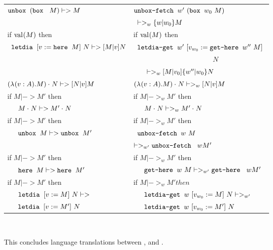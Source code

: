 \footnotesize
\begin{tabular}{@{} l l}

\langLF{}  &  \langHyb{} \\[0.1cm]
\hline

$\unbox (\bbox {} M) |-> M$  & 
$\unboxfetch {w'} (\bbox {w_0} M) $\\
~&
~$|->_w \substw{w}{w_0} M$\\[0.3cm]

if ${\val M}$ then&
if ${\val M}$ then\\
~${\letdia v {} {\here M} N |-> \substt{M}{v}{N}}$ &
~$\letdiaget {w'} v {w_0} {\gethere {w''} M} {}$\\
~& ~~~~~~~~~~~~~~~~~~~~~~~$N $\\
~~~ & 
~~~ $ |->_w \substt{M}{v_0}{\substw{w''}{w_0}{N}}$\\[0.3cm]


$\appl {(\lam v A M)} {N} |-> \substt{N}{v}{M}$ &
$\appl {(\lam v A M)} {N} |->_w \substt{N}{v}{M}$\\[0.3cm]

if ${M |-> M'}$ then &
if ${M |->_w M'}$ then \\
~~~${\appl{M}{N} |->\appl{M'}{N}}$&
~~~${\appl{M}{N} |->_w \appl{M'}{N}}$\\[0.3cm]

if ${M|-> M'} $ then &
if ${M|->_w M'} $ then \\
~~~${\unbox M |-> \unbox M'}$&
~${\unboxfetch w M} $\\
~& $|->_{w'} {\unboxfetch w M'}$\\[0.3cm]


if ${M|-> M'} $ then &
if ${M|->_w M'}$ then \\
~~~${\here M |-> \here M'}$&
~~~$ {\gethere w M |->_{w'} \gethere w M'}$\\[0.3cm]

if ${M|-> M'}$ then& 
if $M|->_w M' then$ \\
~~~$\letdia v {} M  N |->$ & 
~~~$\letdiaget w v {w_0} M N |->_{w'} $\\
~~~$\letdia v {} {M'} N$ &
~~~$\letdiaget w  v {w_0} {M'} N$
\end{tabular}\\
\normalsize

This concludes language translations between \langL{}, \langLF{} and \langHyb{}.